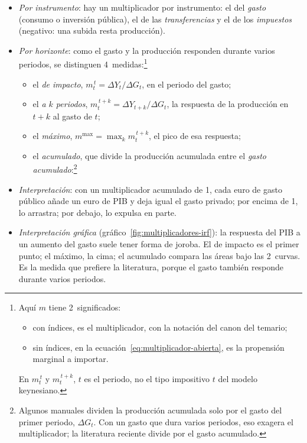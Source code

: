 \documentclass[11pt]{article}
\begin{document}
\begin{itemize}
\item \emph{Por instrumento}: hay un multiplicador por instrumento: el del \emph{gasto} (consumo o inversión pública), el de las \emph{transferencias} y el de los \emph{impuestos} (negativo: una subida resta producción).
\item \emph{Por horizonte}: como el gasto y la producción responden durante varios periodos, se distinguen 4~medidas:\footnote{Aquí $m$ tiene 2~significados:
\begin{itemize}
\item con índices, es el multiplicador, con la notación del canon del temario;
\item sin índices, en la ecuación~\eqref{eq:multiplicador-abierta}, es la propensión marginal a importar.
\end{itemize}
En $m^{\,t}_t$ y $m^{\,t+k}_t$, $t$ es el periodo, no el tipo impositivo $t$ del modelo keynesiano.}
  \begin{itemize}
  \item el \emph{de impacto}, $m^{\,t}_t=\Delta Y_t/\Delta G_t$, en el periodo del gasto;
  \item el \emph{a $k$ periodos}, $m^{\,t+k}_t=\Delta Y_{t+k}/\Delta G_t$, la respuesta de la producción en $t+k$ al gasto de $t$;
  \item el \emph{máximo}, $m^{\max}=\max_k m^{\,t+k}_t$, el pico de esa respuesta;
  \item el \emph{acumulado}, que divide la producción acumulada entre el \emph{gasto acumulado}:\footnote{Algunos manuales dividen la producción acumulada solo por el gasto del primer periodo, $\Delta G_t$. Con un gasto que dura varios periodos, eso exagera el multiplicador; la literatura reciente divide por el gasto acumulado\nocite{RameyZubairy2018,Ramey2019Ten}.}
  \end{itemize}
\item \emph{Interpretación}: con un multiplicador acumulado de 1, cada euro de gasto público añade un euro de PIB y deja igual el gasto privado; por encima de 1, lo arrastra; por debajo, lo expulsa en parte.
\item \emph{Interpretación gráfica} (gráfico~\ref{fig:multiplicadores-irf}): la respuesta del PIB a un aumento del gasto suele tener forma de joroba. El de impacto es el primer punto; el máximo, la cima; el acumulado compara las áreas bajo las 2~curvas. Es la medida que prefiere la literatura, porque el gasto también responde durante varios periodos.
\end{itemize}
\end{document}
